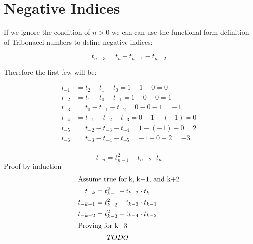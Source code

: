 \documentclass[a4paper]{article}
\begin{document}
\pagebreak

\section{Negative Indices}\label{sec:negative}
If we ignore the condition of $n>0$ we can can use the functional form definition of Tribonacci numbers to define
negative indices:

\begin{equation}
t_{n-3} = t_n - t_{n-1} - t_{n-2}\label{eq:equation3}
\end{equation}

Therefore the first few will be:

\begin{align*}
t_{-1} &= t_{2} - t_{1} - t_{0} = 1 - 1 - 0 = 0\\
t_{-2} &= t_{1} - t_{0} - t_{-1} = 1 - 0 - 0 = 1\\
t_{-3} &= t_{0} - t_{-1} - t_{-2} = 0 - 0 - 1 = -1\\
t_{-4} &= t_{-1} - t_{-2} - t_{-3} = 0 - 1 - (-1) = 0\\
t_{-5} &= t_{-2} - t_{-3} - t_{-4} = 1 - (-1) - 0 = 2\\
t_{-6} &= t_{-3} - t_{-4} - t_{-5} = -1 - 0 - 2 = -3\\
\end{align*}

\begin{theorem}
\[
t_{-n} = t_{n-1}^2 - t_{n-2} \cdot t_{n}
\]
Proof by induction
\begin{gather*}
\shortintertext{Assume true for k, k+1, and k+2}
t_{-k} = t_{k-1}^2 - t_{k-2} \cdot t_{k}\\
t_{-k-1} = t_{k-2}^2 - t_{k-3} \cdot t_{k-1}\\
t_{-k-2} = t_{k-3}^2 - t_{k-4} \cdot t_{k-2}\\
\shortintertext{Proving for k+3}
TODO
\end{gather*}
\end{theorem}
\end{document}
